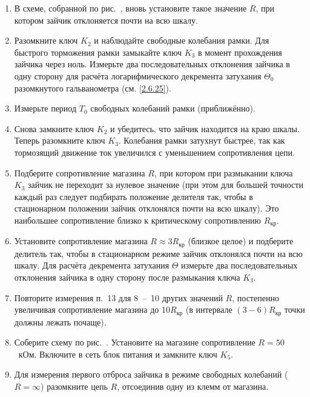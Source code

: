 \begin{lab:task}
\begin{enumerate}
	\item В схеме, собранной по рис.~, вновь установите такое значение
$R$, при котором зайчик отклоняется почти на всю шкалу.

	\item Разомкните ключ $K_2$ и наблюдайте свободные
колебания рамки. Для быстрого торможения рамки замыкайте ключ
$K_3$ в момент прохождения зайчика через ноль.
Измерьте два последовательных отклонения зайчика в одну сторону для
расчёта логарифмического декремента затухания $\Theta_0$ разомкнутого гальванометра
(см. \eqref{2.6.25}).

	\item Измерьте период $T_0$ свободных колебаний рамки
(приближённо).

	\item Снова замкните ключ $K_2$ и убедитесь, что
зайчик находится на краю шкалы. Теперь разомкните ключ
$K_3$. Колебания рамки затухнут быстрее, так как
тормозящий движение ток увеличился с уменьшением сопротивления цепи.

	\item Подберите  сопротивление магазина $R$, при
котором при размыкании ключа $K_3$ зайчик не
переходит за нулевое значение (при этом для большей точности каждый раз
следует подбирать положение делителя так, чтобы в стационарном положении
зайчик отклонялся почти на всю шкалу). Это наибольшее сопротивление
близко к критическому сопротивлению $R_{\text{кр}}$.

	\item Установите сопротивление магазина $R \approx 3R_{\text{кр}}$ (близкое целое) и подберите
делитель так, чтобы в стационарном режиме зайчик отклонялся почти на всю
шкалу. Для расчёта декремента затухания $\Theta$ измерьте два последовательных
отклонения зайчика в одну сторону после размыкания ключа $K_3$.

	\item Повторите измерения п.~13 для 8~--~10 других значений $R$,
постепенно увеличивая сопротивление магазина до $10R_{\text{кр}}$ (в интервале $(3-6)R_{\text{кр}}$
точки должны лежать почаще).


	\item Соберите схему по рис.~. Установите на магазине сопротивление
$R=50$~кОм. Включите в сеть блок питания и замкните ключ
$K_5$.

	\item Для измерения первого отброса зайчика в режиме свободных колебаний
($R = \infty$) разомкните цепь $R$, отсоединив одну из клемм от магазина.


\end{enumerate}
\end{lab:task}
